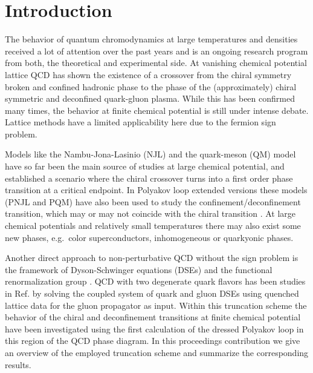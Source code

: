 \documentclass[a4paper,fleqn]{cas-dc}
\begin{document}
\section{Introduction}

The behavior of quantum chromodynamics at large temperatures and densities received a lot of attention over the past
years and is an ongoing research program from both, the theoretical and experimental side. At vanishing chemical potential
lattice QCD has shown the existence of a crossover from the chiral symmetry broken and confined hadronic phase to the
phase of the (approximately) chiral symmetric and deconfined quark-gluon plasma. While this has been confirmed many
times, the behavior at finite chemical potential is still under intense debate. Lattice methods have a limited applicability
here due to the fermion sign problem.

Models like the Nambu-Jona-Lasinio (NJL) and the quark-meson (QM) model have so far been the main source of
studies at large chemical potential, and established a scenario where the chiral crossover turns into a first order phase
transition at a critical endpoint. In Polyakov loop extended versions these models (PNJL and PQM) have also been used to
study the confinement/deconfinement transition, which may or may not coincide with the chiral transition \cite{HERBST201158,PhysRevD.73.014019,PhysRevD074023,PhysRevC.83.054904}. At large
chemical potentials and relatively small temperatures there may also exist some new phases, e.g.\ color superconductors,
inhomogeneous \cite{KOJO201037,PhysRevLett.103.072301} or quarkyonic \cite{MCLERRAN200783} phases.

Another direct approach to non-perturbative QCD without the sign problem is the framework of Dyson-Schwinger
equations (DSEs) \cite{PhysRevLett.103.052003,Fischer2010,FISCHER2011438} and the functional renormalization group \cite{BRAUN2010262,PhysRevLett.106.022002}. QCD with two degenerate quark flavors has
been studies in Ref. \cite{FISCHER2011438} by solving the coupled system of quark and gluon DSEs using quenched lattice data for the gluon
propagator as input. Within this truncation scheme the behavior of the chiral and deconfinement transitions at finite
chemical potential have been investigated using the first calculation of the dressed Polyakov loop in this region of the QCD 
phase diagram. In this proceedings contribution we give an overview of the employed truncation scheme and summarize
the corresponding results.
\end{document}
